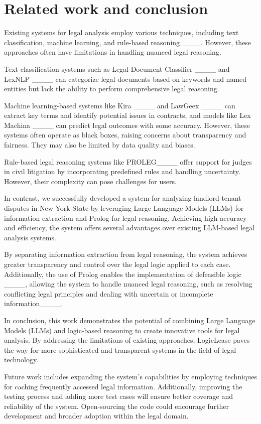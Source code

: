 \section{Related work and conclusion}
\label{sec:related-conclusion}

Existing systems for legal analysis employ various techniques, including text classification, machine learning, and rule-based reasoning____. However, these approaches often have limitations in handling nuanced legal reasoning. 

Text classification systems such as Legal-Document-Classifier ____ and LexNLP ____  can categorize legal documents based on keywords and named entities but lack the ability to perform comprehensive legal reasoning. 

Machine learning-based systems like Kira ____ and LawGeex ____ can extract key terms and identify potential issues in contracts, and models like Lex Machina ____ can predict legal outcomes with some accuracy. However, these systems often operate as black boxes, raising concerns about transparency and fairness. They may also be limited by data quality and biases.

Rule-based legal reasoning systems like PROLEG____ offer support for judges in civil litigation by incorporating predefined rules and handling uncertainty. However, their complexity can pose challenges for users.

In contrast, we successfully developed a system for analyzing landlord-tenant disputes in New York State by leveraging Large Language Models (LLMs) for information extraction and Prolog for legal reasoning. Achieving high accuracy and efficiency, the system offers several advantages over existing LLM-based legal analysis systems.

By separating information extraction from legal reasoning, the system achieves greater transparency and control over the legal logic applied to each case. Additionally, the use of Prolog enables the implementation of defeasible logic ____, allowing the system to handle nuanced legal reasoning, such as resolving conflicting legal principles and dealing with uncertain or incomplete information____.


In conclusion, this work demonstrates the potential of combining Large Language Models (LLMs) and logic-based reasoning to create innovative tools for legal analysis. By addressing the limitations of existing approaches, LogicLease paves the way for more sophisticated and transparent systems in the field of legal technology.

Future work includes expanding the system's capabilities by employing techniques for caching frequently accessed legal information. Additionally, improving the testing process and adding more test cases will ensure better coverage and reliability of the system. Open-sourcing the code could encourage further development and broader adoption within the legal domain.

\nocite{*}

